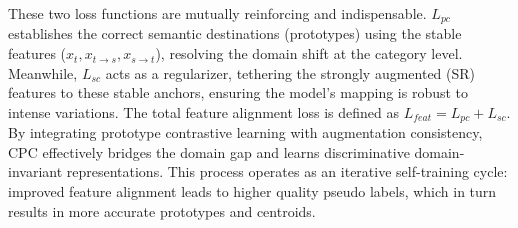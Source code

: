 These two loss functions are mutually reinforcing and indispensable. $L_{pc}$ establishes the correct semantic destinations (prototypes) using the stable features ($x_t, x_{t \to s}, x_{s \to t}$), resolving the domain shift at the category level. Meanwhile, $L_{sc}$ acts as a regularizer, tethering the strongly augmented (SR) features to these stable anchors, ensuring the model's mapping is robust to intense variations. The total feature alignment loss is defined as $L_{feat} = L_{pc} + L_{sc}$. By integrating prototype contrastive learning with augmentation consistency, CPC effectively bridges the domain gap and learns discriminative domain-invariant representations. This process operates as an iterative self-training cycle: improved feature alignment leads to higher quality pseudo labels, which in turn results in more accurate prototypes and centroids.

